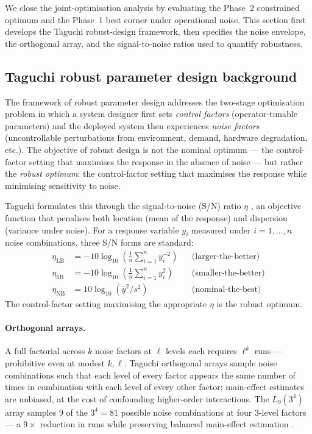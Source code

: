 \documentclass[conference]{IEEEtran}
\begin{document}
We close the joint-optimisation analysis by evaluating the Phase~2 constrained optimum and the Phase~1 best corner under operational noise. This section first develops the Taguchi robust-design framework, then specifies the noise envelope, the orthogonal array, and the signal-to-noise ratios used to quantify robustness.

\subsection{Taguchi robust parameter design background}
\label{sec:taguchi_method}

The framework of robust parameter design \cite{taguchi1986,phadke1989,ross1996} addresses the two-stage optimisation problem in which a system designer first sets \emph{control factors} (operator-tunable parameters) and the deployed system then experiences \emph{noise factors} (uncontrollable perturbations from environment, demand, hardware degradation, etc.). The objective of robust design is not the nominal optimum --- the control-factor setting that maximises the response in the absence of noise --- but rather the \emph{robust optimum}: the control-factor setting that maximises the response while minimising sensitivity to noise.

Taguchi formulates this through the signal-to-noise (S/N) ratio $\eta$ \cite{taguchi1986}, an objective function that penalises both location (mean of the response) and dispersion (variance under noise). For a response variable $y_i$ measured under $i = 1,\ldots,n$ noise combinations, three S/N forms are standard:
\begin{align}
  \eta_\text{LB} &= -10\log_{10}\!\left(\tfrac{1}{n}\sum_{i=1}^n y_i^{-2}\right) && \text{(larger-the-better)} \label{eq:sn_lb} \\
  \eta_\text{SB} &= -10\log_{10}\!\left(\tfrac{1}{n}\sum_{i=1}^n y_i^{2}\right)  && \text{(smaller-the-better)} \label{eq:sn_sb} \\
  \eta_\text{NB} &= 10\log_{10}\!\left(\bar{y}^2 / s^2\right) && \text{(nominal-the-best)} \label{eq:sn_nb}
\end{align}
The control-factor setting maximising the appropriate $\eta$ is the robust optimum.

\paragraph{Orthogonal arrays.}
A full factorial across $k$ noise factors at $\ell$ levels each requires $\ell^k$ runs --- prohibitive even at modest $k, \ell$. Taguchi orthogonal arrays \cite{taguchi1986,ross1996} sample noise combinations such that each level of every factor appears the same number of times in combination with each level of every other factor; main-effect estimates are unbiased, at the cost of confounding higher-order interactions. The $L_9(3^4)$ array samples 9 of the $3^4 = 81$ possible noise combinations at four 3-level factors --- a $9{\times}$ reduction in runs while preserving balanced main-effect estimation \cite{phadke1989}.
\end{document}

